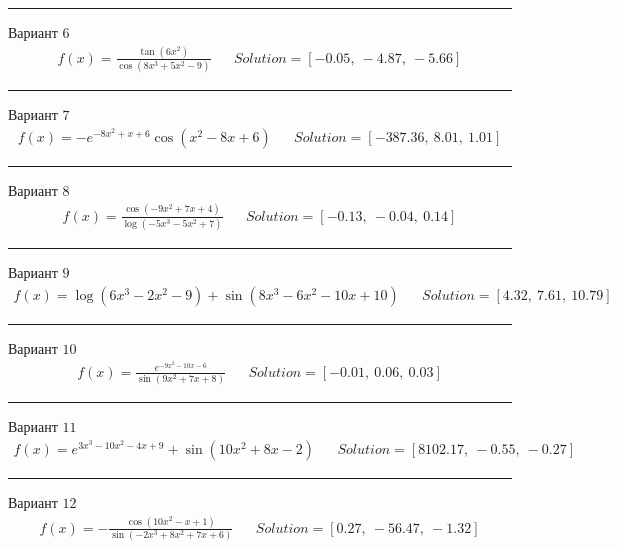 \documentclass[11pt]{report}
\begin{document}
\begin{center}
    \noindent\rule{8cm}{0.4pt}
\end{center}
Вариант \(6\)
\begin{align*}
    f(x) = \frac{\tan{\left(6 x^{2} \right)}}{\cos{\left(8 x^{3} + 5 x^{2} - 9 \right)}} && Solution = \left[ -0.05, \  -4.87, \  -5.66\right]
\end{align*}
\begin{center}
    \noindent\rule{8cm}{0.4pt}
\end{center}
Вариант \(7\)
\begin{align*}
    f(x) = - e^{- 8 x^{2} + x + 6} \cos{\left(x^{2} - 8 x + 6 \right)} && Solution = \left[ -387.36, \  8.01, \  1.01\right]
\end{align*}
\begin{center}
    \noindent\rule{8cm}{0.4pt}
\end{center}
Вариант \(8\)
\begin{align*}
    f(x) = \frac{\cos{\left(- 9 x^{2} + 7 x + 4 \right)}}{\log{\left(- 5 x^{3} - 5 x^{2} + 7 \right)}} && Solution = \left[ -0.13, \  -0.04, \  0.14\right]
\end{align*}
\begin{center}
    \noindent\rule{8cm}{0.4pt}
\end{center}
Вариант \(9\)
\begin{align*}
    f(x) = \log{\left(6 x^{3} - 2 x^{2} - 9 \right)} + \sin{\left(8 x^{3} - 6 x^{2} - 10 x + 10 \right)} && Solution = \left[ 4.32, \  7.61, \  10.79\right]
\end{align*}
\begin{center}
    \noindent\rule{8cm}{0.4pt}
\end{center}
Вариант \(10\)
\begin{align*}
    f(x) = \frac{e^{- 9 x^{2} - 10 x - 6}}{\sin{\left(9 x^{2} + 7 x + 8 \right)}} && Solution = \left[ -0.01, \  0.06, \  0.03\right]
\end{align*}
\begin{center}
    \noindent\rule{8cm}{0.4pt}
\end{center}
Вариант \(11\)
\begin{align*}
    f(x) = e^{3 x^{3} - 10 x^{2} - 4 x + 9} + \sin{\left(10 x^{2} + 8 x - 2 \right)} && Solution = \left[ 8102.17, \  -0.55, \  -0.27\right]
\end{align*}
\begin{center}
    \noindent\rule{8cm}{0.4pt}
\end{center}
Вариант \(12\)
\begin{align*}
    f(x) = - \frac{\cos{\left(10 x^{2} - x + 1 \right)}}{\sin{\left(- 2 x^{3} + 8 x^{2} + 7 x + 6 \right)}} && Solution = \left[ 0.27, \  -56.47, \  -1.32\right]
\end{align*}
\end{document}
